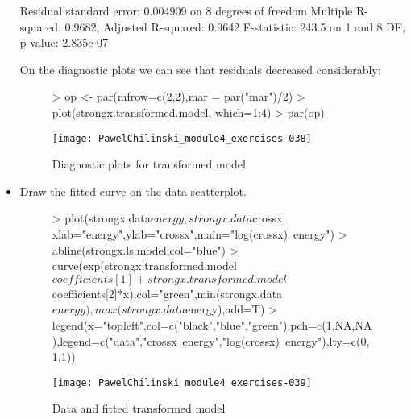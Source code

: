 \documentclass[a4paper]{article}
\begin{document}
\begin{itemize}
\begin{Schunk}
\begin{Soutput}
Residual standard error: 0.004909 on 8 degrees of freedom
Multiple R-squared:  0.9682,	Adjusted R-squared:  0.9642 
F-statistic: 243.5 on 1 and 8 DF,  p-value: 2.835e-07
\end{Soutput}
\end{Schunk}
On the diagnostic plots we can see that residuals decreased considerably:
\begin{figure}[H]
\begin{center}
\begin{Schunk}
\begin{Sinput}
> op <- par(mfrow=c(2,2),mar = par("mar")/2)
> plot(strongx.transformed.model, which=1:4)
> par(op)
\end{Sinput}
\end{Schunk}
\texttt{[image: PawelChilinski\_module4\_exercises-038]}
\caption{Diagnostic plots for transformed model}
\end{center}
\end{figure}

\item Draw the fitted curve on the data scatterplot.
\begin{figure}[H]
\begin{center}
\begin{Schunk}
\begin{Sinput}
> plot(strongx.data$energy,strongx.data$crossx, xlab="energy",ylab="crossx",main="log(crossx)~energy")
> abline(strongx.ls.model,col="blue")
> curve(exp(strongx.transformed.model$coefficients[1]+strongx.transformed.model$coefficients[2]*x),col="green",min(strongx.data$energy),max(strongx.data$energy),add=T)
> legend(x="topleft",col=c("black","blue","green"),pch=c(1,NA,NA),legend=c("data","crossx~energy","log(crossx)~energy"),lty=c(0,1,1))
\end{Sinput}
\end{Schunk}
\texttt{[image: PawelChilinski\_module4\_exercises-039]}
\caption{Data and fitted transformed model}
\end{center}
\end{figure}
\end{itemize}
\end{document}
